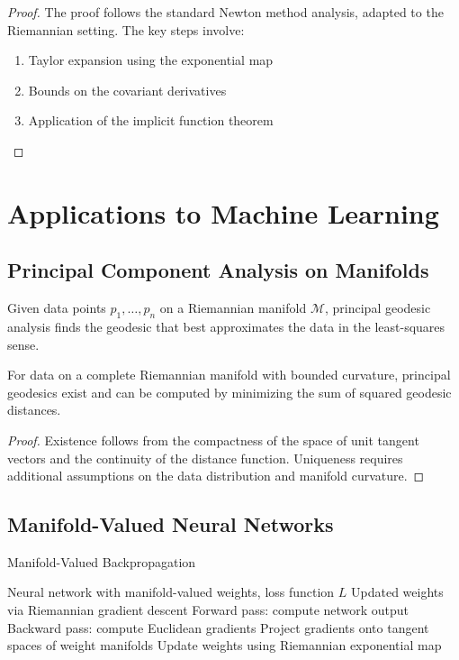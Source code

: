 \begin{proof}
The proof follows the standard Newton method analysis, adapted to the Riemannian setting. The key steps involve:
\begin{enumerate}
\item Taylor expansion using the exponential map
\item Bounds on the covariant derivatives
\item Application of the implicit function theorem
\end{enumerate}
\end{proof}

\section{Applications to Machine Learning}

\subsection{Principal Component Analysis on Manifolds}

\begin{definition}
\label{def:principal_geodesic_analysis}
Given data points $p_1, \ldots, p_n$ on a Riemannian manifold $\mathcal{M}$, principal geodesic analysis finds the geodesic that best approximates the data in the least-squares sense.
\end{definition}

\begin{theorem}
\label{thm:principal_geodesics_existence}
For data on a complete Riemannian manifold with bounded curvature, principal geodesics exist and can be computed by minimizing the sum of squared geodesic distances.
\end{theorem}

\begin{proof}
Existence follows from the compactness of the space of unit tangent vectors and the continuity of the distance function. Uniqueness requires additional assumptions on the data distribution and manifold curvature.
\end{proof}

\subsection{Manifold-Valued Neural Networks}

\begin{algorithm}
\caption{Manifold-Valued Backpropagation}
\begin{algorithmic}[1]
\Require Neural network with manifold-valued weights, loss function $L$
\Ensure Updated weights via Riemannian gradient descent
\State Forward pass: compute network output
\State Backward pass: compute Euclidean gradients
\State Project gradients onto tangent spaces of weight manifolds
\State Update weights using Riemannian exponential map
\end{algorithmic}
\end{algorithm}

